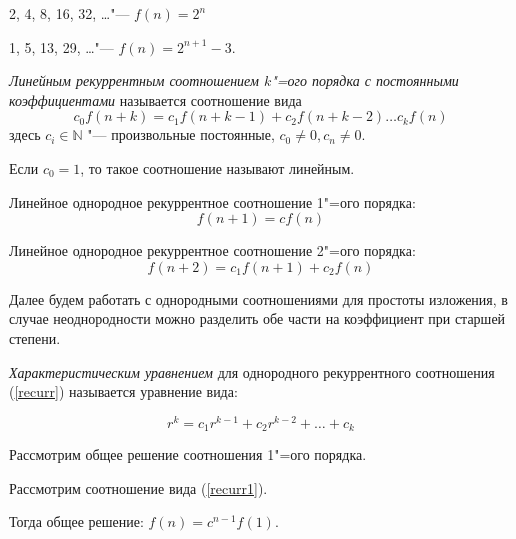 \begin{example}
    2, 4, 8, 16, 32, \dots "--- $f(n) = 2^n$
\end{example}

\begin{example}
    1, 5, 13, 29, \dots "--- $f(n) = 2^{n + 1} - 3$.
\end{example}

\begin{definition}
    \textit{Линейным рекуррентным соотношением $k$"=ого порядка с постоянными
    коэффициентами} называется соотношение вида 
    \begin{equation}
        c_0 f(n + k) = c_1f(n + k - 1) + c_2 f(n + k - 2) \dots c_k f(n)
        \label{recurr}
    \end{equation}
    здесь $c_i \in \mathbb{N}$ "--- произвольные постоянные, $c_0 \neq 0, c_n \neq 0$.
    
    Если $c_0 = 1$, то такое соотношение называют линейным.

    Линейное однородное рекуррентное соотношение  1"=ого порядка:
    \begin{equation}
        f(n + 1) = cf(n) \label{recurr1}
    \end{equation}

    Линейное однородное рекуррентное соотношение 2"=ого порядка:
    \begin{equation}
    f(n + 2) = c_1 f(n + 1) + c_2 f(n) \label{recurr2}
    \end{equation}
\end{definition}

Далее будем работать с однородными соотношениями для простоты
изложения, в случае неоднородности можно разделить обе части
на коэффициент при старшей степени.

\begin{definition}
    \textit{Характеристическим уравнением} для однородного рекуррентного
    соотношения (\ref{recurr}) называется уравнение вида:

    \begin{equation*}
        r^k = c_1 r^{k - 1} + c_2 r^{k - 2} + \dots + c_k
    \end{equation*}
\end{definition}
Рассмотрим общее решение соотношения 1"=ого порядка.
\begin{theorem}[Общее решение линейный рекуррентных соотношений 1"=ого порядка
    с постоянными коэффициентами]
    Рассмотрим соотношение вида (\ref{recurr1}).

    Тогда общее решение: $f(n) = c^{n - 1} f(1)$.
\end{theorem}

